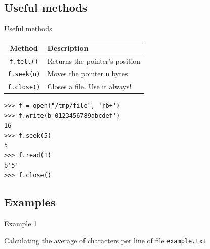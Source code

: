 \documentclass[10pt,compress]{beamer} %
\begin{document}
\subsection{Useful methods}
\begin{frame}[fragile]{Useful methods}

	\begin{tabular}{c|l}\hline
  	\sc Method & \sc Description  \\\hline
  	\texttt{f.tell()} & Returns the pointer's position \\
  	\texttt{f.seek(n)} & Moves the pointer \texttt{n} bytes \\
  	\texttt{f.close()} & Closes a file. Use it always! \\\hline
  	\end{tabular}

\begin{verbatim}
>>> f = open("/tmp/file", 'rb+')
>>> f.write(b'0123456789abcdef')
16
>>> f.seek(5)
5
>>> f.read(1)
b'5'
>>> f.close()
\end{verbatim}
\end{frame}

\subsection{Examples}
\begin{frame}[fragile]{Example 1}{}
	\begin{exampleblock}{Calculating the average of characters per line of file \texttt{example.txt}}
	\vspace{-0.2cm}
	
	\vspace{-0.2cm}
	\end{exampleblock}
\end{frame}
\end{document}
